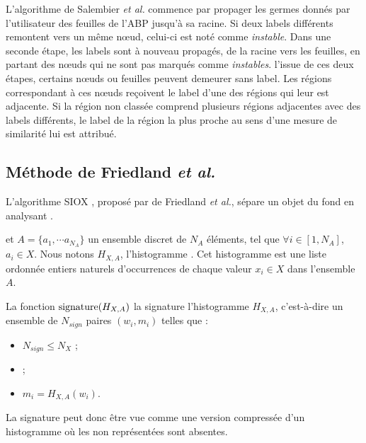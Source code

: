L'algorithme de Salembier \textit{et al.}  commence par propager les germes donnés par l'utilisateur des feuilles de l'ABP jusqu'à sa racine. Si deux labels différents remontent vers un même nœud, celui-ci est noté comme \emph{instable}. Dans une seconde étape, les labels sont à nouveau propagés, de la racine vers les feuilles, en partant des nœuds qui ne sont pas marqués comme \emph{instables}.  l'issue de ces deux étapes, certains nœuds ou feuilles peuvent demeurer sans label. Les régions correspondant à ces nœuds reçoivent le label d'une des régions qui leur est adjacente. Si la région non classée comprend plusieurs régions adjacentes avec des labels différents, le label de la région la plus proche au sens d'une mesure de similarité lui est attribué. 

\subsection{Méthode de Friedland \textit{et al.}}

L'algorithme SIOX \cite{friedland2005siox}, proposé par de Friedland \textit{et al.}, sépare un objet du fond en analysant . 

 et $A=\lbrace a_{1}, \cdots a_{N_{A}} \rbrace$ un ensemble discret de $N_{A}$ éléments, tel que $\forall i \in [1,N_{A}]$, $a_{i} \in X$. Nous notons $H_{X,A}$,  l'histogramme . Cet histogramme est une liste ordonnée  entiers naturels  d'occurrences de chaque valeur $x_{i} \in X$ dans l'ensemble $A$. 

La fonction $\operatorname*{signature}(H_{X,A})$  la signature  l'histogramme $H_{X,A}$, c'est-à-dire un ensemble de $N_{sign}$ paires $(w_{i},m_{i})$ telles que :
\begin{itemize}
\item $N_{sign} \leq N_{X}$ ;
\item {}  ;
\item $m_{i} = H_{X,A}(w_{i})$.
\end{itemize}
La signature peut donc être vue comme une version compressée d'un histogramme où les  non représentées sont absentes. 

